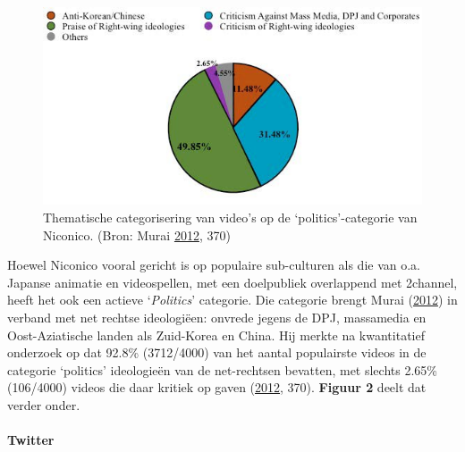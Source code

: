 \documentclass[10.5pt,dutch,]{article}
\let\oldparagraph\paragraph
\renewcommand{\paragraph}[1]{\oldparagraph{#1}\mbox{}}
\begin{document}
\begin{figure}[htbp]
\centering
\includegraphics{images/murai_2012_nico.jpg}
\caption{Thematische categorisering van video's op de
`politics'-categorie van Niconico. (Bron: Murai
\protect\hyperlink{ref-muraiux5fnetux5f2012}{2012}, 370)}
\end{figure}

Hoewel Niconico vooral gericht is op populaire sub-culturen als die van
o.a. Japanse animatie en videospellen, met een doelpubliek overlappend
met 2channel, heeft het ook een actieve `\emph{Politics}' categorie. Die
categorie brengt Murai
(\protect\hyperlink{ref-muraiux5fnetux5f2012}{2012}) in verband met net
rechtse ideologiëen: onvrede jegens de DPJ, massamedia en
Oost-Aziatische landen als Zuid-Korea en China. Hij merkte na
kwantitatief onderzoek op dat 92.8\% (3712/4000) van het aantal
populairste videos in de categorie `politics' ideologieën van de net-rechtsen bevatten, met slechts 2.65\% (106/4000) videos die daar kritiek
op gaven (\protect\hyperlink{ref-muraiux5fnetux5f2012}{2012}, 370).
\textbf{Figuur 2} deelt dat verder onder.

\paragraph{Twitter}\label{twitter}
\end{document}
